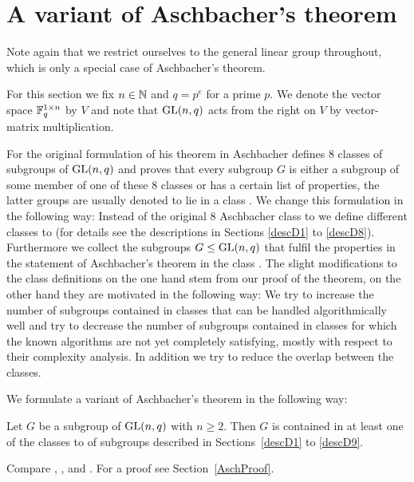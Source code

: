 \section{A variant of Aschbacher's theorem}
\label{sect:aschbacher}

Note again that we restrict ourselves to the general linear group
throughout, which is only a special case of Aschbacher's theorem.

\begin{Not}
For this section we fix $n \in \mathbb{N}$ and $q=p^e$ for a prime $p$.
We denote the vector space $\mathbb{F}_q^{1
\times n}$ by $V$ and note that $\GL(n,q)$ acts from the right on $V$ by
vector-matrix multiplication.
\end{Not}

For the original formulation of his theorem in \cite{aschbacher} Aschbacher 
defines $8$ classes
of subgroups of $\GL(n,q)$ and proves that every subgroup $G$ is either
a subgroup of some member of one of these $8$ classes or has a certain
list of properties, the latter groups are usually denoted to lie in
a class . We change this formulation in the following
way: Instead of the original 8 Aschbacher class  to 
we define different classes  to 
(for details see the descriptions in Sections \ref{descD1} to
\ref{descD8}).
Furthermore we collect
the subgroups $G \le \GL(n,q)$ that fulfil the properties in the statement of 
Aschbacher's theorem in the class . The slight modifications 
to the class definitions on the one hand stem from our proof of the
theorem, on the other hand they are motivated in the following way: We try
to increase the number of subgroups contained in classes that can be
handled algorithmically well and try to decrease the number of subgroups
contained in classes for which the known algorithms are not yet completely
satisfying, mostly with respect to their complexity analysis.
In addition we try to reduce the overlap between the classes.

We formulate a variant of Aschbacher's theorem in the following way:

\begin{Theo}
\label{Asch}
Let $G$ be a subgroup of\/ $\GL(n,q)$ with $n \ge 2$.
Then $G$ is contained in at least one of the
classes  to  of subgroups described in Sections~\ref{descD1}
to \ref{descD9}.
\end{Theo}
\proofbeg Compare \cite[Appendix 2, Theorem 1]{RobPhd}, \cite{aschbacher}, 
\cite{kleilieb} and 
\cite[Theorem~1]{smashprim}. For a proof see Section~\ref{AschProof}.
\proofend

